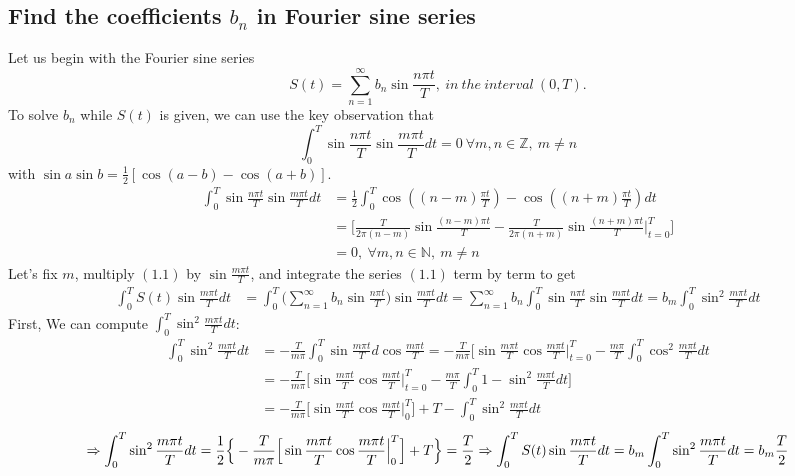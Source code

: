 \documentclass[a4 paper]{article}
\begin{document}
\subsection{Find the coefficients $b_n$ in Fourier sine series}
Let us begin with the Fourier sine series
\begin{equation}
    S(t)=\sum_{n=1}^\infty b_n\sin{\frac{n\pi t}{T}}, \ in \ the \ interval \ (0,T).
\end{equation}
To solve $b_n$ while $S(t)$ is given, we can use the key observation that $$\int_0^T \sin{\frac{n\pi t}{T}}\sin{\frac{m\pi t}{T}}dt=0 \ \forall m,n\in\mathbb{Z}, \  m\neq n$$ with $\sin{a}\sin{b}=\frac{1}{2}[\cos{(a-b)}-\cos{(a+b)}]$.
\begin{equation}
\begin{split}
\int_0^T \sin{\frac{n\pi t}{T}}\sin{\frac{m\pi t}{T}}dt&=\frac{1}{2}\int_0^T \cos{((n-m)\frac{\pi t}{T})}-\cos{((n+m)\frac{\pi t}{T})}dt\\&=\Big[\frac{T}{2\pi(n-m)}\sin{\frac{(n-m)\pi t}{T}}-\frac{T}{2\pi(n+m)}\sin{\frac{(n+m)\pi t}{T}}\Big|^T_{t=0}\Big]\\
&=0, \ \forall m,n\in\mathbb{N}, \ m\neq n
\end{split}
\end{equation} Let’s fix $m$, multiply $(1.1)$ by $\sin\frac{m\pi t}{T}$, and integrate the series $(1.1)$ term by term to get
\begin{equation}
\begin{split}
\int_0^T S(t)\sin{\frac{m\pi t}{T}}dt&=\int_0^T \Big(\sum_{n=1}^\infty b_n\sin{\frac{n\pi t}{T}}\Big)\sin{\frac{m\pi t}{T}}dt=\sum_{n=1}^\infty b_n\int_0^T \sin{\frac{n\pi t}{T}}\sin{\frac{m\pi t}{T}}dt=b_m\int_0^T \sin^2{\frac{m\pi t}{T}}dt
\end{split}
\end{equation} First, We can compute $\int_0^T\sin^2{\frac{m\pi t}{T}}dt$: \begin{equation}
\begin{split}
\int_0^T \sin^2{\frac{m\pi t}{T}}dt&=-\frac{T}{m\pi}\int_0^T\sin{\frac{m\pi t}{T}}d\cos{\frac{m\pi t}{T}}=-\frac{T}{m\pi}\Big[\sin{\frac{m\pi t}{T}}\cos{\frac{m\pi t}{T}}\Big|_{t=0}^T-\frac{m\pi}{T}\int_0^T \cos^2{\frac{m\pi t}{T}}dt\\&=-\frac{T}{m\pi}\Big[\sin{\frac{m\pi t}{T}}\cos{\frac{m\pi t}{T}}\Big|_{t=0}^T-\frac{m\pi}{T}\int_0^T 1-\sin^2{\frac{m\pi t}{T}}dt\Big]\\&=-\frac{T}{m\pi}\Big[\sin{\frac{m\pi t}{T}}\cos{\frac{m\pi t}{T}}\Big|_0^T\Big]+T-\int_0^T \sin^2{\frac{m\pi t}{T}}dt
\end{split}
\end{equation} $$\Rightarrow\int_0^T \sin^2{\frac{m\pi t}{T}}dt=\frac{1}{2}\Big\{-\frac{T}{m\pi}\Big[\sin{\frac{m\pi t}{T}}\cos{\frac{m\pi t}{T}}\Big|_0^T\Big]+T\Big\}=\frac{T}{2}\\\Rightarrow\int_0^T S(t)\sin{\frac{m\pi t}{T}}dt=b_m\int_0^T \sin^2{\frac{m\pi t}{T}}dt=b_m\frac{T}{2}$$
\end{document}

